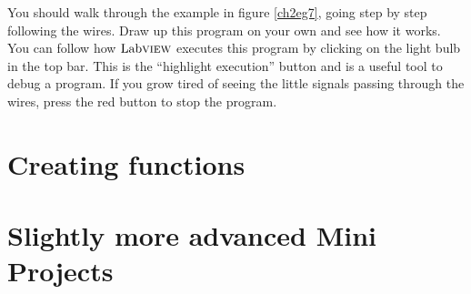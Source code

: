 You should walk through the example in figure \ref{ch2eg7}, going step by step following the wires. Draw up this program on your own and see how it works. You can follow how $\text{Lab}\textsc{view}$ executes this program by clicking on the light bulb in the top bar. This is the ``highlight execution'' button and is a useful tool to debug a program. If you grow tired of seeing the little signals passing through the wires, press the red button to stop the program.

\section{Creating functions}

\section{Slightly more advanced Mini Projects}
